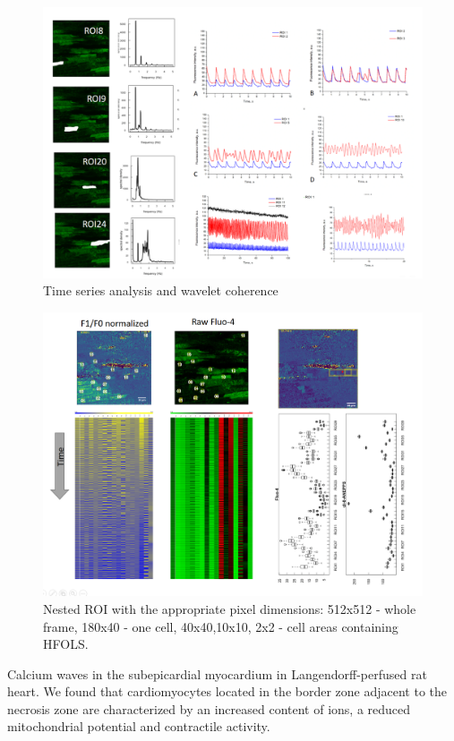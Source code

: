 \documentclass{biophys-new}
\begin{document}
\begin{figure}
    \includegraphics[width=0.8\linewidth]{fig4.png}
    \caption{Time series analysis and wavelet coherence}
    \label{fig:fig4}
\end{figure}


\begin{figure}
    \includegraphics[width=0.8\linewidth]{fig5.png}
    \caption{Nested ROI with the appropriate pixel dimensions: 512x512 - whole frame, 180x40 - one cell, 40x40,10x10, 2x2 - cell areas containing HFOLS.}
    \label{fig:fig5}
\end{figure}

Calcium waves in the subepicardial myocardium in Langendorff-perfused rat heart.
We found that cardiomyocytes located in the border zone adjacent to the necrosis zone are characterized by an increased content of  ions, a reduced mitochondrial potential and contractile activity.
\end{document}
